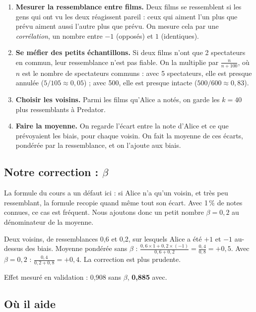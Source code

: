 \documentclass[11pt,a4paper]{article}
\begin{document}
\begin{enumerate}
  \item \textbf{Mesurer la ressemblance entre films.} Deux films se ressemblent si les
        gens qui ont vu les deux réagissent pareil : ceux qui aiment l'un plus que prévu
        aiment aussi l'autre plus que prévu. On mesure cela par une \emph{corrélation},
        un nombre entre $-1$ (opposés) et $1$ (identiques).
  \item \textbf{Se méfier des petits échantillons.} Si deux films n'ont que 2 spectateurs
        en commun, leur ressemblance n'est pas fiable. On la multiplie par
        $\frac{n}{n + 100}$, où $n$ est le nombre de spectateurs communs : avec 5 spectateurs,
        elle est presque annulée ($5/105 \approx 0{,}05$) ; avec 500, elle est presque
        intacte ($500/600 \approx 0{,}83$).
  \item \textbf{Choisir les voisins.} Parmi les films qu'Alice a notés, on garde les
        $k = 40$ plus ressemblants à Predator.
  \item \textbf{Faire la moyenne.} On regarde l'écart entre la note d'Alice et ce que
        prévoyaient les biais, pour chaque voisin. On fait la moyenne de ces écarts,
        pondérée par la ressemblance, et on l'ajoute aux biais.
\end{enumerate}

\subsection{Notre correction : \texorpdfstring{$\beta$}{beta}}

La formule du cours a un défaut ici : si Alice n'a qu'un voisin, et très peu ressemblant,
la formule recopie quand même tout son écart. Avec 1\,\% de notes connues, ce cas est
fréquent. Nous ajoutons donc un petit nombre $\beta = 0{,}2$ au dénominateur de la moyenne.

\begin{exemple}
Deux voisins, de ressemblances 0,6 et 0,2, sur lesquels Alice a été $+1$ et $-1$ au-dessus
des biais. Moyenne pondérée sans $\beta$ :
$\frac{0{,}6 \times 1 + 0{,}2 \times (-1)}{0{,}6 + 0{,}2} = \frac{0{,}4}{0{,}8} = +0{,}5$.
Avec $\beta = 0{,}2$ : $\frac{0{,}4}{0{,}2 + 0{,}8} = +0{,}4$. La correction est plus prudente.
\end{exemple}

Effet mesuré en validation : 0,908 sans $\beta$, \textbf{0,885} avec.

\subsection{Où il aide}
\end{document}
